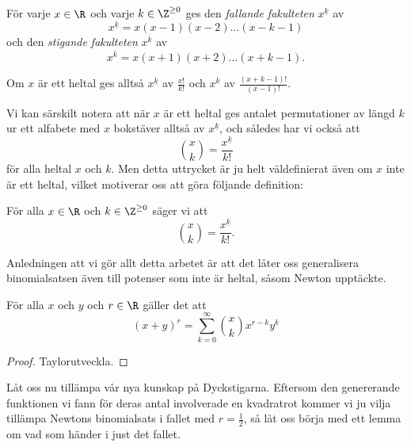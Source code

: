 \documentclass{tufte-handout}
\begin{document}
\begin{definition}
    För varje $x\in \R$ och varje $k \in \Z^{\geq 0}$ ges den \emph{fallande fakulteten} $x^{\underline{k}}$ av
    $$x^{\underline{k}} = x(x-1)(x-2)\ldots(x-k-1)$$
    och den \emph{stigande fakulteten} $x^{\overline{k}}$ av
    $$x^{\overline{k}} = x(x+1)(x+2)\ldots(x+k-1).$$

    Om $x$ är ett heltal ges alltså $x^{\underline{k}}$ av $\frac{x!}{k!}$ och $x^{\overline{k}}$ av $\frac{(x+k-1)!}{(x-1)!}$.
\end{definition}

Vi kan särskilt notera att när $x$ är ett heltal ges antalet permutationer av längd $k$ ur ett alfabete med $x$ bokstäver alltså av $x^{\underline{k}}$, och således har vi också att
$$\binom{x}{k} = \frac{x^{\underline{k}}}{k!}$$
för alla heltal $x$ och $k$. Men detta uttrycket är ju helt väldefinierat även om $x$ inte är ett heltal, vilket motiverar oss att göra följande definition:

\begin{definition}
    För alla $x \in \R$ och $k \in \Z^{\geq 0}$ säger vi att
    $$\binom{x}{k} = \frac{x^{\underline{k}}}{k!}.$$
\end{definition}

Anledningen att vi gör allt detta arbetet är att det låter oss generalisera binomialsatsen även till potenser som inte är heltal, såsom Newton upptäckte.

\begin{theorem}
    För alla $x$ och $y$ och $r \in \R$ gäller det att
    $$(x + y)^r = \sum_{k=0}^{\infty} \binom{x}{k} x^{r-k} y^k$$

    \begin{proof}
        Taylorutveckla.
    \end{proof}
\end{theorem}

Låt oss nu tillämpa vår nya kunskap på Dyckstigarna. Eftersom den genererande funktionen vi fann för deras antal involverade en kvadratrot kommer vi ju vilja tillämpa Newtons binomialsats i fallet med $r = \frac{1}{2}$, så låt oss börja med ett lemma om vad som händer i just det fallet.
\end{document}
